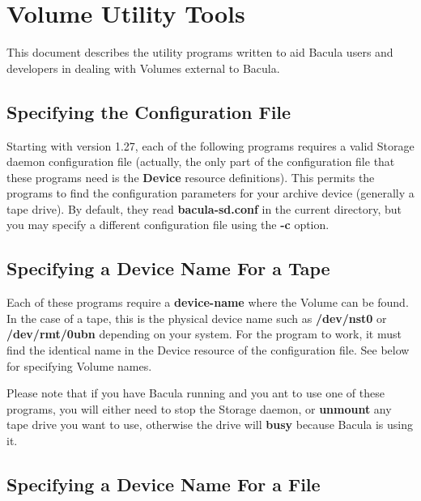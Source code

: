 
\chapter{Volume Utility Tools}
\label{_UtilityChapter}

This document describes the utility programs written to aid Bacula users and
developers in dealing with Volumes external to Bacula.

\section{Specifying the Configuration File}

Starting with version 1.27, each of the following programs requires a valid
Storage daemon configuration file (actually, the only part of the
configuration file that these programs need is the {\bf Device} resource
definitions). This permits the programs to find the configuration parameters
for your archive device (generally a tape drive). By default, they read {\bf
bacula-sd.conf} in the current directory, but you may specify a different
configuration file using the {\bf -c} option.


\section{Specifying a Device Name For a Tape}

Each of these programs require a {\bf device-name} where the Volume can be
found. In the case of a tape, this is the physical device name such as {\bf
/dev/nst0} or {\bf /dev/rmt/0ubn} depending on your system. For the program to
work, it must find the identical name in the Device resource of the
configuration file. See below for specifying Volume names.

Please note that if you have Bacula running and you ant to use
one of these programs, you will either need to stop the Storage daemon, or
{\bf unmount} any tape drive you want to use, otherwise the drive
will {\bf busy} because Bacula is using it.


\section{Specifying a Device Name For a File}

